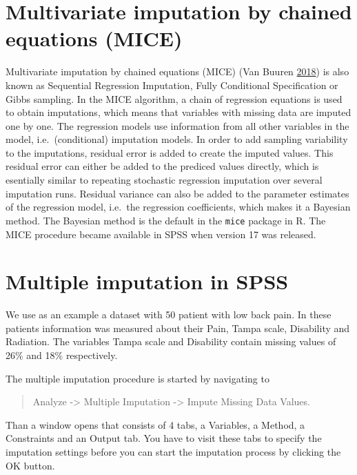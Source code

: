 \documentclass[
]{book}
\begin{document}
\hypertarget{multivariate-imputation-by-chained-equations-mice}{%
\section{Multivariate imputation by chained equations
(MICE)}\label{multivariate-imputation-by-chained-equations-mice}}

Multivariate imputation by chained equations (MICE) (Van Buuren
\protect\hyperlink{ref-VanBuuren2018}{2018}) is also known as Sequential
Regression Imputation, Fully Conditional Specification or Gibbs
sampling. In the MICE algorithm, a chain of regression equations is used
to obtain imputations, which means that variables with missing data are
imputed one by one. The regression models use information from all other
variables in the model, i.e.~(conditional) imputation models. In order
to add sampling variability to the imputations, residual error is added
to create the imputed values. This residual error can either be added to
the prediced values directly, which is esentially similar to repeating
stochastic regression imputation over several imputation runs. Residual
variance can also be added to the parameter estimates of the regression
model, i.e.~the regression coefficients, which makes it a Bayesian
method. The Bayesian method is the default in the \texttt{mice} package
in R. The MICE procedure became available in SPSS when version 17 was
released.

\hypertarget{multiple-imputation-in-spss}{%
\section{Multiple imputation in
SPSS}\label{multiple-imputation-in-spss}}

We use as an example a dataset with 50 patient with low back pain. In
these patients information was measured about their Pain, Tampa scale,
Disability and Radiation. The variables Tampa scale and Disability
contain missing values of 26\% and 18\% respectively.

The multiple imputation procedure is started by navigating to

\begin{quote}
Analyze -\textgreater{} Multiple Imputation -\textgreater{} Impute
Missing Data Values.
\end{quote}

Than a window opens that consists of 4 tabs, a Variables, a Method, a
Constraints and an Output tab. You have to visit these tabs to specify
the imputation settings before you can start the imputation process by
clicking the OK button.
\end{document}
